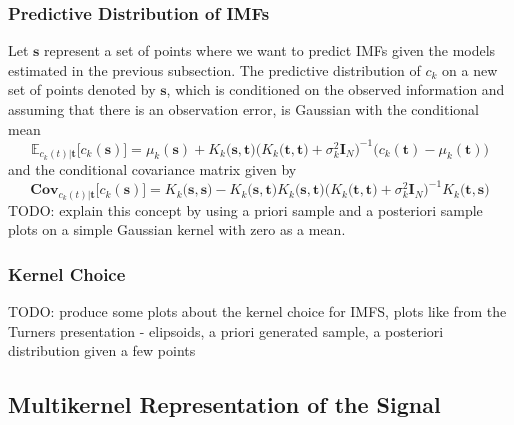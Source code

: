\documentclass[article,moreauthors,pdftex,10pt,a4paper]{ssrn}
\begin{document}
\subsubsection{Predictive Distribution of IMFs}
Let $\mathbf{s}$ represent a set of points where we want to predict IMFs given the models estimated in the previous subsection.  The predictive distribution of $c_k$ on a new set of points denoted by $\mathbf{s}$, which is conditioned on the observed information and assuming that there is an observation error, is Gaussian with the conditional mean
\begin{equation*}
\mathbb{E}_{c_k(t)|\mathbf{t}} \big[c_k(\mathbf{s})] = \mu_k(\mathbf{s}) +  K_k \big(\mathbf{s},\mathbf{t}\big)\Big( K_k \big(\mathbf{t},\mathbf{t}\big) + \sigma^2_k \mathbf{I}_N \Big) ^{-1} \big( c_k(\mathbf{t}) - \mu_k(\mathbf{t})\big) 
\end{equation*}
and the conditional covariance matrix given by
\begin{equation*}
\mathbf{Cov}_{c_k(t)|\mathbf{t}} \big[c_k(\mathbf{s})] = K_k \big(\mathbf{s},\mathbf{s}\big) - K_k\big(\mathbf{s},\mathbf{t}\big) K_k \big(\mathbf{s},\mathbf{t}\big)\Big( K_k \big(\mathbf{t},\mathbf{t}\big) + \sigma^2_k \mathbf{I}_N \Big)^{-1} K_k \big(\mathbf{t},\mathbf{s}\big) 
\end{equation*}
TODO: explain this concept by using a priori sample and a posteriori sample plots on a simple Gaussian kernel with zero as a mean. 


\subsubsection{Kernel Choice}
TODO: produce some plots about the kernel choice for IMFS, plots like from the Turners presentation - elipsoids, a priori generated sample, a posteriori distribution given a few points

\subsection{Multikernel Representation of the Signal}
\end{document}

